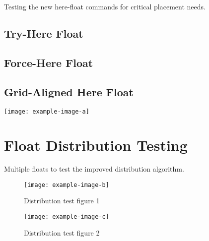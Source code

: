 \documentclass[11pt]{article}
\begin{document}
Testing the new here-float commands for critical placement needs.

\subsection{Try-Here Float}

\lipsum[7][1-5]


\lipsum[7][6-10]

\subsection{Force-Here Float}

\lipsum[8][1-5]


\lipsum[8][6-10]

\subsection{Grid-Aligned Here Float}

\lipsum[9][1-5]

\begin{herefloat}
  \texttt{[image: example-image-a]}
\end{herefloat}

\lipsum[9][6-10]

\section{Float Distribution Testing}

Multiple floats to test the improved distribution algorithm.

\begin{figure}[tbp]
  \centering
  \texttt{[image: example-image-b]}
  \caption{Distribution test figure 1}
\end{figure}

\begin{figure}[tbp]
  \centering
  \texttt{[image: example-image-c]}
  \caption{Distribution test figure 2}
\end{figure}
\end{document}
